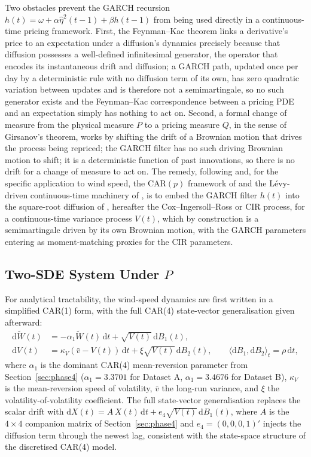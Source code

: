 \documentclass[11pt, a4paper, twoside]{article}
\begin{document}
Two obstacles prevent the GARCH recursion $h(t) = \omega + \alpha\hat\eta^2(t-1) + \beta h(t-1)$ from being used directly in a continuous-time pricing framework. First, the Feynman--Kac theorem links a derivative's price to an expectation under a diffusion's dynamics precisely because that diffusion possesses a well-defined infinitesimal generator, the operator that encodes its instantaneous drift and diffusion; a GARCH path, updated once per day by a deterministic rule with no diffusion term of its own, has zero quadratic variation between updates and is therefore not a semimartingale, so no such generator exists and the Feynman--Kac correspondence between a pricing PDE and an expectation simply has nothing to act on. Second, a formal change of measure from the physical measure $P$ to a pricing measure $Q$, in the sense of Girsanov's theorem, works by shifting the drift of a Brownian motion that drives the process being repriced; the GARCH filter has no such driving Brownian motion to shift; it is a deterministic function of past innovations, so there is no drift for a change of measure to act on. The remedy, following \citet{Heston1993} and, for the specific application to wind speed, the CAR$(p)$ framework of \citet{BenthSaltyteBenth2009} and the Lévy-driven continuous-time machinery of \citet{BrockwellMarquardt2005}, is to embed the GARCH filter $h(t)$ into the square-root diffusion of \citet{CoxIngersollRoss1985}, hereafter the Cox--Ingersoll--Ross or CIR process, for a continuous-time variance process $V(t)$, which by construction is a semimartingale driven by its own Brownian motion, with the GARCH parameters entering as moment-matching proxies for the CIR parameters.

\subsection{Two-SDE System Under $P$}
\label{sec:phase5-sde}

For analytical tractability, the wind-speed dynamics are first written in a simplified CAR(1) form, with the full CAR(4) state-vector generalisation given afterward:
\begin{align}
\mathrm d\widetilde W(t) &= -\alpha_1 \widetilde W(t)\, \mathrm dt + \sqrt{V(t)}\, \mathrm dB_1(t), \\
\mathrm dV(t) &= \kappa_V(\bar v - V(t))\, \mathrm dt + \xi \sqrt{V(t)}\, \mathrm dB_2(t), \qquad \langle \mathrm dB_1, \mathrm dB_2\rangle_t = \rho\, \mathrm dt,
\end{align}
where $\alpha_1$ is the dominant CAR(4) mean-reversion parameter from Section~\ref{sec:phase4} ($\alpha_1 = 3.3701$ for Dataset A, $\alpha_1 = 3.4676$ for Dataset B), $\kappa_V$ is the mean-reversion speed of volatility, $\bar v$ the long-run variance, and $\xi$ the volatility-of-volatility coefficient. The full state-vector generalisation replaces the scalar drift with $\mathrm dX(t) = A\, X(t)\, \mathrm dt + e_4 \sqrt{V(t)}\, \mathrm dB_1(t)$, where $A$ is the $4\times4$ companion matrix of Section~\ref{sec:phase4} and $e_4 = (0,0,0,1)'$ injects the diffusion term through the newest lag, consistent with the state-space structure of the discretised CAR(4) model.
\end{document}
